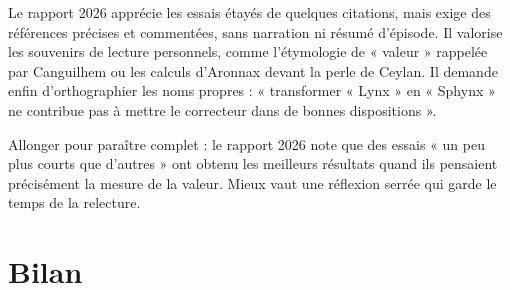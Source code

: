 \documentclass[11pt,a4paper]{article}
\begin{document}
\begin{jury}

Le rapport 2026 apprécie les essais étayés de quelques citations, mais exige des références précises et commentées, sans narration ni résumé d'épisode. Il valorise les souvenirs de lecture personnels, comme l'étymologie de « valeur » rappelée par Canguilhem ou les calculs d'Aronnax devant la perle de Ceylan. Il demande enfin d'orthographier les noms propres : « transformer « Lynx » en « Sphynx » ne contribue pas à mettre le correcteur dans de bonnes dispositions ».

\end{jury}

\begin{piege}

Allonger pour paraître complet : le rapport 2026 note que des essais « un peu plus courts que d'autres » ont obtenu les meilleurs résultats quand ils pensaient précisément la mesure de la valeur. Mieux vaut une réflexion serrée qui garde le temps de la relecture.

\end{piege}

\hypertarget{bilan}{%
\section{Bilan}\label{bilan}}
\end{document}
